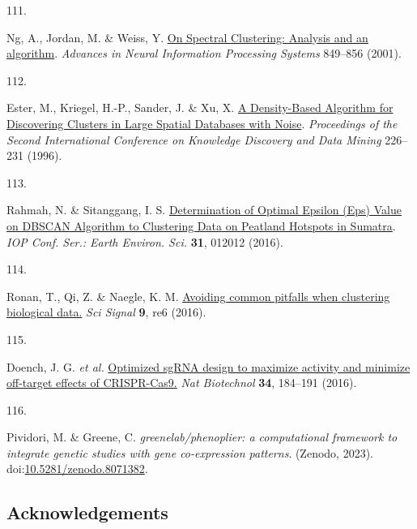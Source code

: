 \documentclass[
  a4paper,
]{article}
\newlength{\cslhangindent}
\newlength{\csllabelwidth}
\newlength{\cslentryspacingunit} %
\newenvironment{CSLReferences}[2] %
 {%
  \setlength{\parindent}{0pt}
  \ifodd #1
  \let\oldpar\par
  \def\par{\hangindent=\cslhangindent\oldpar}
  \fi
  \setlength{\parskip}{#2\cslentryspacingunit}
 }%
 {}
\newcommand{\CSLLeftMargin}[1]{\parbox[t]{\csllabelwidth}{#1}}
\newcommand{\CSLRightInline}[1]{\parbox[t]{\linewidth - \csllabelwidth}{#1}\break}
\begin{document}
\begin{CSLReferences}{0}{0}
\leavevmode{}%
\CSLLeftMargin{111. }%
\CSLRightInline{Ng, A., Jordan, M. \& Weiss, Y. \href{https://ai.stanford.edu/~ang/papers/nips01-spectral.pdf}{On Spectral Clustering: Analysis and an algorithm}. \emph{Advances in Neural Information Processing Systems} 849--856 (2001).}

\leavevmode{}%
\CSLLeftMargin{112. }%
\CSLRightInline{Ester, M., Kriegel, H.-P., Sander, J. \& Xu, X. \href{https://www.aaai.org/Papers/KDD/1996/KDD96-037.pdf}{A Density-Based Algorithm for Discovering Clusters in Large Spatial Databases with Noise}. \emph{Proceedings of the Second International Conference on Knowledge Discovery and Data Mining} 226--231 (1996).}

\leavevmode{}%
\CSLLeftMargin{113. }%
\CSLRightInline{Rahmah, N. \& Sitanggang, I. S. \href{https://doi.org/10.1088/1755-1315/31/1/012012}{Determination of Optimal Epsilon (Eps) Value on DBSCAN Algorithm to Clustering Data on Peatland Hotspots in Sumatra}. \emph{IOP Conf. Ser.: Earth Environ. Sci.} \textbf{31}, 012012 (2016).}

\leavevmode{}%
\CSLLeftMargin{114. }%
\CSLRightInline{Ronan, T., Qi, Z. \& Naegle, K. M. \href{https://doi.org/10.1126/scisignal.aad1932}{Avoiding common pitfalls when clustering biological data.} \emph{Sci Signal} \textbf{9}, re6 (2016).}

\leavevmode{}%
\CSLLeftMargin{115. }%
\CSLRightInline{Doench, J. G. \emph{et al.} \href{https://doi.org/10.1038/nbt.3437}{Optimized sgRNA design to maximize activity and minimize off-target effects of CRISPR-Cas9.} \emph{Nat Biotechnol} \textbf{34}, 184--191 (2016).}

\leavevmode{}%
\CSLLeftMargin{116. }%
\CSLRightInline{Pividori, M. \& Greene, C. \emph{greenelab/phenoplier: a computational framework to integrate genetic studies with gene co-expression patterns}. (Zenodo, 2023). doi:\href{https://doi.org/10.5281/zenodo.8071382}{10.5281/zenodo.8071382}.}

\end{CSLReferences}

\hypertarget{acknowledgements}{%
\subsection{Acknowledgements}\label{acknowledgements}}
\end{document}
